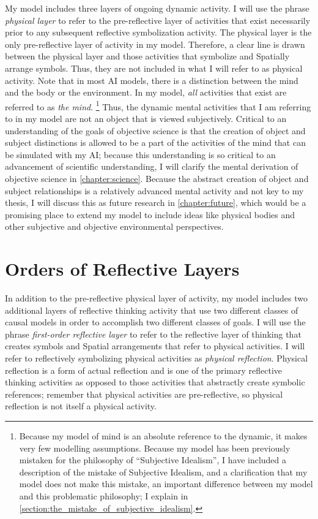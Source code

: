My model includes three layers of ongoing dynamic activity.  I will
use the phrase \emph{physical layer} to refer to the pre-reflective
layer of activities that exist necessarily prior to any subsequent
reflective symbolization activity.  The physical layer is the only
pre-reflective layer of activity in my model.  Therefore, a clear line
is drawn between the physical layer and those activities that
symbolize and Spatially arrange symbols.  Thus, they are not included
in what I will refer to as physical activity.  Note that in most AI
models, there is a distinction between the mind and the body or the
environment.  In my model, \emph{all} activities that exist are
referred to as \emph{the mind}.
\footnote{Because my model of mind is an absolute reference to the
  dynamic, it makes very few modelling assumptions.  Because my model
  has been previously mistaken for the philosophy of ``Subjective
  Idealism'', I have included a description of the mistake of
  Subjective Idealism, and a clarification that my model does not make
  this mistake, an important difference between my model and this
  problematic philosophy; I explain in
  \autoref{section:the_mistake_of_subjective_idealism}.}  Thus, the
dynamic mental activities that I am referring to in my model are not
an object that is viewed subjectively.  Critical to an understanding
of the goals of objective science is that the creation of object and
subject distinctions is allowed to be a part of the activities of the
mind that can be simulated with my AI; because this understanding is
so critical to an advancement of scientific understanding, I will
clarify the mental derivation of objective science in
\autoref{chapter:science}.  Because the abstract creation of object
and subject relationships is a relatively advanced mental activity and
not key to my thesis, I will discuss this as future research in
\autoref{chapter:future}, which would be a promising place to extend
my model to include ideas like physical bodies and other subjective
and objective environmental perspectives.

\section{Orders of Reflective Layers}

In addition to the pre-reflective physical layer of activity, my model
includes two additional layers of reflective thinking activity that
use two different classes of causal models in order to accomplish two
different classes of goals.  I will use the phrase \emph{first-order
  reflective layer} to refer to the reflective layer of thinking that
creates symbols and Spatial arrangements that refer to physical
activities.  I will refer to reflectively symbolizing physical
activities as \emph{physical reflection}.  Physical reflection is a
form of actual reflection and is one of the primary reflective
thinking activities as opposed to those activities that abstractly
create symbolic references; remember that physical activities are
pre-reflective, so physical reflection is not itself a physical
activity.

